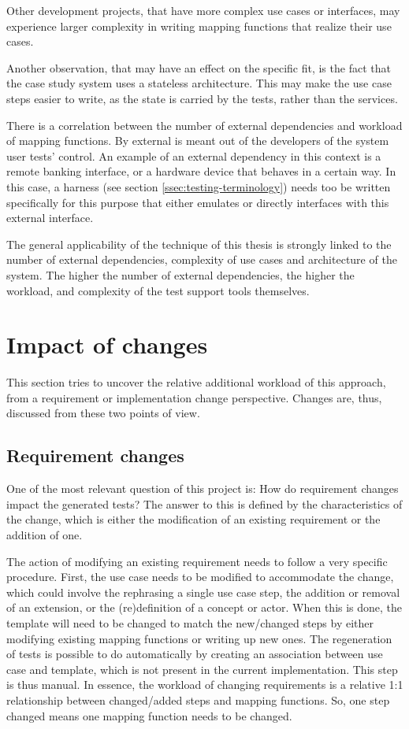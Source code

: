 \noindent Other development projects, that have more complex use cases or interfaces, may experience larger complexity in writing mapping functions that realize their use cases.\medskip

\noindent Another observation, that may have an effect on the specific fit, is the fact that the case study system uses a stateless architecture. This may make the use case steps easier to write, as the state is carried by the tests, rather than the services.\medskip

\noindent There is a correlation between the number of external dependencies and workload of mapping functions. By external is meant out of the developers of the system user tests' control. An example of an external dependency in this context is a remote banking interface, or a hardware device that behaves in a certain way. In this case, a harness (see section \ref{ssec:testing-terminology}) needs too be written specifically for this purpose that either emulates or directly interfaces with this external interface.\bigskip

\noindent The general applicability of the technique of this thesis is strongly linked to the number of external dependencies, complexity of use cases and architecture of the system. The higher the number of external dependencies, the higher the workload, and complexity of the test support tools themselves.

\section{Impact of changes}
This section tries to uncover the relative additional workload of this approach, from a requirement or implementation change perspective. Changes are, thus, discussed from these two points of view.

\subsection{Requirement changes}
One of the most relevant question of this project is: How do requirement changes impact the generated tests? The answer to this is defined by the characteristics of the change, which is either the modification of an existing requirement or the addition of one.\medskip

\noindent The action of modifying an existing requirement needs to follow a very specific procedure. First, the use case needs to be modified to accommodate the change, which could involve the rephrasing a single use case step, the addition or removal of an extension, or the (re)definition of a concept or actor. When this is done, the template will need to be changed to match the new/changed steps by either modifying existing mapping functions or writing up new ones. The regeneration of tests is possible to do automatically by creating an association between use case and template, which is not present in the current implementation. This step is thus manual. In essence, the workload of changing requirements is a relative 1:1 relationship between changed/added steps and mapping functions. So, one step changed means one mapping function needs to be changed.\medskip

